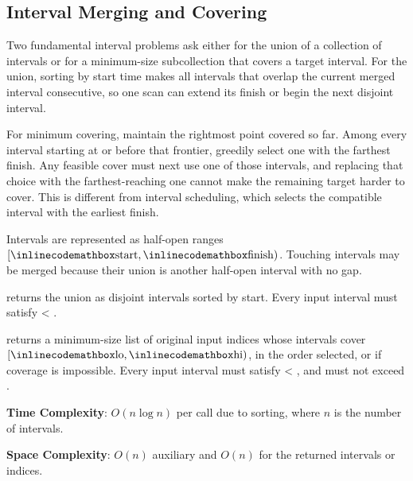 \subsection{Interval Merging and Covering}
\label{sec:1.5.4}
Two fundamental interval problems ask either for the union of a collection of intervals or for a minimum-size subcollection that covers a target interval. For the union, sorting by start time makes all intervals that overlap the current merged interval consecutive, so one scan can extend its finish or begin the next disjoint interval.

For minimum covering, maintain the rightmost point covered so far. Among every interval starting at or before that frontier, greedily select one with the farthest finish. Any feasible cover must next use one of those intervals, and replacing that choice with the farthest-reaching one cannot make the remaining target harder to cover. This is different from interval scheduling, which selects the compatible interval with the earliest finish.

Intervals are represented as half-open ranges $[{\inlinecodemath{start}}, {\inlinecodemath{finish}})$. Touching intervals may be merged because their union is another half-open interval with no gap.

\begin{compactitem}
  \item {} returns the union as disjoint intervals sorted by start. Every input interval must satisfy  \textless{} .
  \item {} returns a minimum-size list of original input indices whose intervals cover $[{\inlinecodemath{lo}}, {\inlinecodemath{hi}})$, in the order selected, or  if coverage is impossible. Every input interval must satisfy  \textless{} , and  must not exceed .
\end{compactitem}

\textbf{Time Complexity}: $O(n \log n)$ per call due to sorting, where $n$ is the number of intervals.

\textbf{Space Complexity}: $O(n)$ auxiliary and $O(n)$ for the returned intervals or indices.


